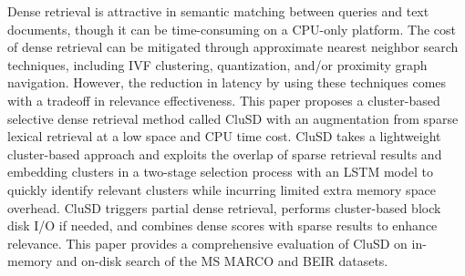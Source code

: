 


Dense retrieval is attractive  in semantic  matching between queries and
text  documents, though it can be time-consuming on a CPU-only platform.
The cost of dense retrieval can be mitigated through approximate nearest neighbor search techniques, including IVF clustering, quantization, and/or 
proximity graph navigation. However, the reduction in latency by using these techniques comes with a tradeoff  in relevance effectiveness. 
This paper proposes a cluster-based selective dense retrieval method called CluSD with an augmentation from sparse lexical retrieval 
at a low space and CPU time cost. 
CluSD takes a lightweight cluster-based approach and exploits the overlap of sparse retrieval results and embedding clusters
in a two-stage selection process with an LSTM model to quickly identify relevant clusters  while incurring limited  extra memory space overhead. 
CluSD  triggers partial dense retrieval, performs cluster-based block disk I/O if needed, and combines dense scores  with  sparse results to enhance relevance. 
This paper provides a comprehensive evaluation of CluSD on in-memory and on-disk search of the MS MARCO and BEIR  datasets.


